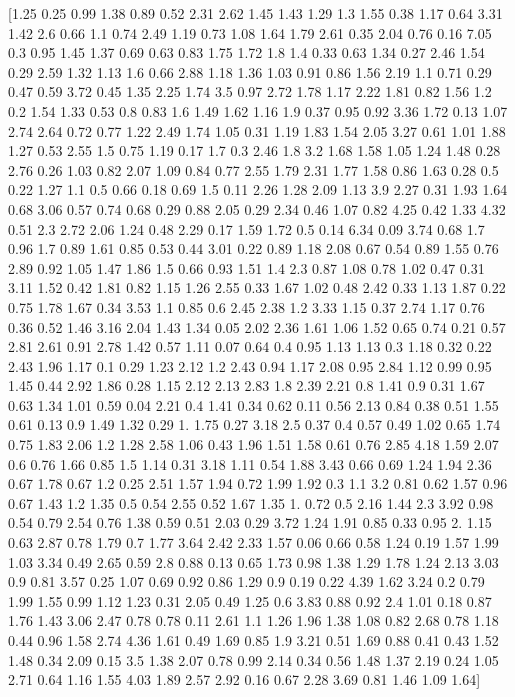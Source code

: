 \documentclass[preview]{standalone}
\begin{document}
\begin{center}
[1.25 0.25 0.99 1.38 0.89 0.52 2.31 2.62 1.45 1.43 1.29 1.3  1.55 0.38
 1.17 0.64 3.31 1.42 2.6  0.66 1.1  0.74 2.49 1.19 0.73 1.08 1.64 1.79
 2.61 0.35 2.04 0.76 0.16 7.05 0.3  0.95 1.45 1.37 0.69 0.63 0.83 1.75
 1.72 1.8  1.4  0.33 0.63 1.34 0.27 2.46 1.54 0.29 2.59 1.32 1.13 1.6
 0.66 2.88 1.18 1.36 1.03 0.91 0.86 1.56 2.19 1.1  0.71 0.29 0.47 0.59
 3.72 0.45 1.35 2.25 1.74 3.5  0.97 2.72 1.78 1.17 2.22 1.81 0.82 1.56
 1.2  0.2  1.54 1.33 0.53 0.8  0.83 1.6  1.49 1.62 1.16 1.9  0.37 0.95
 0.92 3.36 1.72 0.13 1.07 2.74 2.64 0.72 0.77 1.22 2.49 1.74 1.05 0.31
 1.19 1.83 1.54 2.05 3.27 0.61 1.01 1.88 1.27 0.53 2.55 1.5  0.75 1.19
 0.17 1.7  0.3  2.46 1.8  3.2  1.68 1.58 1.05 1.24 1.48 0.28 2.76 0.26
 1.03 0.82 2.07 1.09 0.84 0.77 2.55 1.79 2.31 1.77 1.58 0.86 1.63 0.28
 0.5  0.22 1.27 1.1  0.5  0.66 0.18 0.69 1.5  0.11 2.26 1.28 2.09 1.13
 3.9  2.27 0.31 1.93 1.64 0.68 3.06 0.57 0.74 0.68 0.29 0.88 2.05 0.29
 2.34 0.46 1.07 0.82 4.25 0.42 1.33 4.32 0.51 2.3  2.72 2.06 1.24 0.48
 2.29 0.17 1.59 1.72 0.5  0.14 6.34 0.09 3.74 0.68 1.7  0.96 1.7  0.89
 1.61 0.85 0.53 0.44 3.01 0.22 0.89 1.18 2.08 0.67 0.54 0.89 1.55 0.76
 2.89 0.92 1.05 1.47 1.86 1.5  0.66 0.93 1.51 1.4  2.3  0.87 1.08 0.78
 1.02 0.47 0.31 3.11 1.52 0.42 1.81 0.82 1.15 1.26 2.55 0.33 1.67 1.02
 0.48 2.42 0.33 1.13 1.87 0.22 0.75 1.78 1.67 0.34 3.53 1.1  0.85 0.6
 2.45 2.38 1.2  3.33 1.15 0.37 2.74 1.17 0.76 0.36 0.52 1.46 3.16 2.04
 1.43 1.34 0.05 2.02 2.36 1.61 1.06 1.52 0.65 0.74 0.21 0.57 2.81 2.61
 0.91 2.78 1.42 0.57 1.11 0.07 0.64 0.4  0.95 1.13 1.13 0.3  1.18 0.32
 0.22 2.43 1.96 1.17 0.1  0.29 1.23 2.12 1.2  2.43 0.94 1.17 2.08 0.95
 2.84 1.12 0.99 0.95 1.45 0.44 2.92 1.86 0.28 1.15 2.12 2.13 2.83 1.8
 2.39 2.21 0.8  1.41 0.9  0.31 1.67 0.63 1.34 1.01 0.59 0.04 2.21 0.4
 1.41 0.34 0.62 0.11 0.56 2.13 0.84 0.38 0.51 1.55 0.61 0.13 0.9  1.49
 1.32 0.29 1.   1.75 0.27 3.18 2.5  0.37 0.4  0.57 0.49 1.02 0.65 1.74
 0.75 1.83 2.06 1.2  1.28 2.58 1.06 0.43 1.96 1.51 1.58 0.61 0.76 2.85
 4.18 1.59 2.07 0.6  0.76 1.66 0.85 1.5  1.14 0.31 3.18 1.11 0.54 1.88
 3.43 0.66 0.69 1.24 1.94 2.36 0.67 1.78 0.67 1.2  0.25 2.51 1.57 1.94
 0.72 1.99 1.92 0.3  1.1  3.2  0.81 0.62 1.57 0.96 0.67 1.43 1.2  1.35
 0.5  0.54 2.55 0.52 1.67 1.35 1.   0.72 0.5  2.16 1.44 2.3  3.92 0.98
 0.54 0.79 2.54 0.76 1.38 0.59 0.51 2.03 0.29 3.72 1.24 1.91 0.85 0.33
 0.95 2.   1.15 0.63 2.87 0.78 1.79 0.7  1.77 3.64 2.42 2.33 1.57 0.06
 0.66 0.58 1.24 0.19 1.57 1.99 1.03 3.34 0.49 2.65 0.59 2.8  0.88 0.13
 0.65 1.73 0.98 1.38 1.29 1.78 1.24 2.13 3.03 0.9  0.81 3.57 0.25 1.07
 0.69 0.92 0.86 1.29 0.9  0.19 0.22 4.39 1.62 3.24 0.2  0.79 1.99 1.55
 0.99 1.12 1.23 0.31 2.05 0.49 1.25 0.6  3.83 0.88 0.92 2.4  1.01 0.18
 0.87 1.76 1.43 3.06 2.47 0.78 0.78 0.11 2.61 1.1  1.26 1.96 1.38 1.08
 0.82 2.68 0.78 1.18 0.44 0.96 1.58 2.74 4.36 1.61 0.49 1.69 0.85 1.9
 3.21 0.51 1.69 0.88 0.41 0.43 1.52 1.48 0.34 2.09 0.15 3.5  1.38 2.07
 0.78 0.99 2.14 0.34 0.56 1.48 1.37 2.19 0.24 1.05 2.71 0.64 1.16 1.55
 4.03 1.89 2.57 2.92 0.16 0.67 2.28 3.69 0.81 1.46 1.09 1.64]
\end{center}
\end{document}
